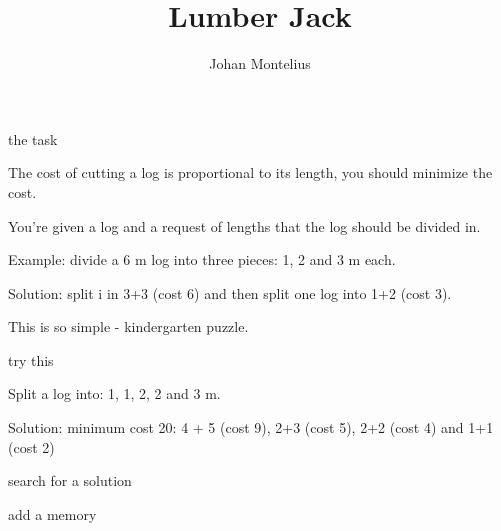 

\title[ID1019 Lumber Jack]{Lumber Jack}


\author{Johan Montelius}
\date{\semester}



\begin{frame}
\titlepage
\end{frame}

\begin{frame}{the task}

  \vspace{10pt}\pause
  The cost of cutting a log is proportional to its length, you should minimize the cost.

  \vspace{10pt}\pause
  You're given a log and a request of lengths that the log should be divided in.

  \vspace{10pt}\pause
  Example: divide a 6 m log into three pieces: 1, 2 and 3 m each.

  \vspace{10pt}\pause
  Solution: split i in 3+3 (cost 6) and then split one log into 1+2 (cost 3).

  \vspace{10pt}\pause
  This is so simple - kindergarten puzzle. 
  
  
\end{frame}

\begin{frame}{try this}

  \vspace{10pt}\pause
  Split a log into: 1, 1, 2, 2 and 3 m.

  \vspace{10pt}\pause
  Solution: minimum cost 20: 4 + 5 (cost 9), 2+3 (cost 5), 2+2 (cost 4) and 1+1 (cost 2)
  
\end{frame}


\begin{frame}{search for a solution}


\end{frame}


\begin{frame}{add a memory}


\end{frame}





